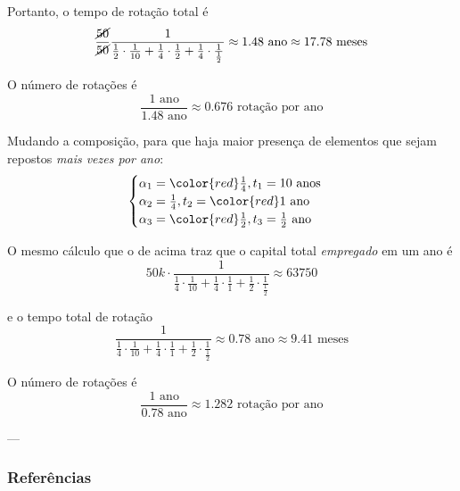 Portanto, o tempo de rotação total é
$$
\frac{\cancel{ 50 }}{\cancel{ 50 }} \frac{1}{\frac{1}{2}\cdot \frac{1}{10} + \frac{1}{4} \cdot \frac{1}{2} + \frac{1}{4} \cdot \frac{1}{\frac{1}{2}}} \approx 1.48 \text{ ano} \approx 17.78 \text{ meses}
$$

O número de rotações é
$$
\frac{1 \text{ ano}}{1.48 \text{ ano}} \approx 0.676 \text{ rotação por ano}
$$

Mudando a composição, para que haja maior presença de elementos que sejam repostos \textit{mais vezes por ano}:
$$
\begin{cases}
\alpha_{1}={\color{red} \frac{1}{4}}, t_{1}=10 \text{ anos} \\
\alpha_{2}=\frac{1}{4}, t_{2}={\color{red} 1} \text{ ano}\\
\alpha_{3}={\color{red} \frac{1}{2}}, t_{3}=\frac{1}{2} \text{ ano}
\end{cases}
$$

O mesmo cálculo que o de acima traz que o capital total \textit{empregado} em um ano é
$$
50k \cdot \frac{1}{\frac{1}{4}\cdot \frac{1}{10} + \frac{1}{4} \cdot \frac{1}{1} + \frac{1}{2} \cdot \frac{1}{\frac{1}{2}}} \approx 63750
$$

e o tempo total de rotação
$$
\frac{1}{\frac{1}{4}\cdot \frac{1}{10} + \frac{1}{4} \cdot \frac{1}{1} + \frac{1}{2} \cdot \frac{1}{\frac{1}{2}}} \approx 0.78 \text{ ano} \approx 9.41 \text{ meses}
$$

O número de rotações é 
$$
\frac{1 \text{ ano}}{0.78 \text{ ano}} \approx 1.282 \text{ rotação por ano}
$$

---
\subsubsection{Referências}
